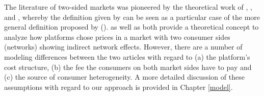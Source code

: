 \documentclass[12pt,a4paper,notitlepage]{article}
\begin{document}
The literature of two-sided markets was pioneered by the theoretical work of \citet{caillaud_chicken_2003}, \citet{rochet_platform_2003}, \citet{evans_antitrust_2003} and \citet{armstrong_competition_2006}, whereby the definition given by \citet{evans_antitrust_2003} can be seen as a particular case of the more general definition proposed by \cite{rochet_platform_2003} (\citet{filistrucchi_identifying_2012}). \citet{rochet_platform_2003} as well as \citet{armstrong_competition_2006} both provide a theoretical concept to analyze how platforms chose prices in a market with two consumer sides (networks) showing indirect network effects. However, there are a number of modeling differences between the two articles with regard to (a) the platform's cost structure, (b) the fee the consumers on both market sides have to pay and (c) the source of consumer heterogeneity. A more detailed discussion of these assumptions with regard to our approach is provided in Chapter \ref{model}.  
\end{document}
